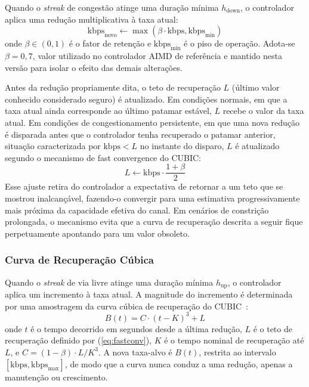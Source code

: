 \documentclass[conference]{IEEEtran}
\begin{document}
Quando o \emph{streak} de congestão atinge uma duração mínima
$h_{\text{down}}$, o controlador aplica uma redução
multiplicativa à taxa atual:
\begin{equation}
  \text{kbps}_{\text{novo}} \gets \max\!\left( \beta \cdot \text{kbps}, \text{kbps}_{\min} \right)
  \label{eq:decrease}
\end{equation}
onde $\beta \in (0,1)$ é o fator de retenção e
$\text{kbps}_{\min}$ é o piso de operação. Adota-se $\beta = 0{,}7$,
valor utilizado no controlador AIMD de referência e mantido
nesta versão para isolar o efeito das demais alterações.

Antes da redução propriamente dita, o teto de recuperação
$L$ (último valor conhecido considerado seguro) é atualizado.
Em condições normais, em que a taxa atual ainda corresponde ao
último patamar estável, $L$ recebe o valor da taxa atual. Em
condições de congestionamento persistente, em que uma nova
redução é disparada antes que o controlador tenha recuperado o
patamar anterior, situação caracterizada por
$\text{kbps} < L$ no instante do disparo, $L$ é atualizado
segundo o mecanismo de fast convergence do
CUBIC:
\begin{equation}
  L \gets \text{kbps} \cdot \frac{1 + \beta}{2}
  \label{eq:fastconv}
\end{equation}
Esse ajuste retira do controlador a expectativa de retornar a
um teto que se mostrou inalcançável, fazendo-o convergir para
uma estimativa progressivamente mais próxima da capacidade
efetiva do canal. Em cenários de constrição prolongada, o
mecanismo evita que a curva de recuperação descrita a seguir
fique perpetuamente apontando para um valor obsoleto.

\subsubsection{Curva de Recuperação Cúbica}

Quando o \emph{streak} de via livre atinge uma duração mínima
$h_{\text{up}}$, o controlador aplica um incremento à taxa
atual. A magnitude do incremento é determinada por uma
amostragem da curva cúbica de recuperação do
CUBIC~\cite{cubic}:
\begin{equation}
  B(t) = C \cdot (t - K)^3 + L
  \label{eq:cubic-controller}
\end{equation}
onde $t$ é o tempo decorrido em segundos desde a última
redução, $L$ é o teto de recuperação definido por
(\ref{eq:fastconv}), $K$ é o tempo nominal de recuperação até
$L$, e $C = (1 - \beta) \cdot L / K^3$. A nova taxa-alvo é
$B(t)$, restrita ao intervalo $[\text{kbps},
\text{kbps}_{\max}]$, de modo que a curva nunca conduz a uma
redução, apenas a manutenção ou crescimento.
\end{document}
